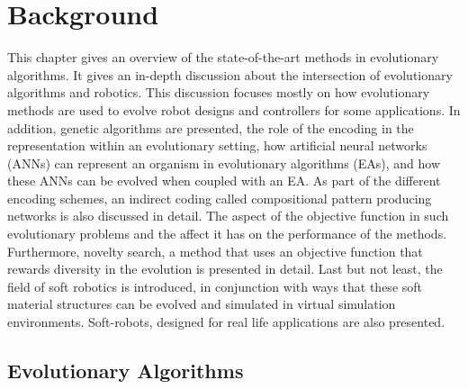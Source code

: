 
\chapter{Background} %

\label{Background} %


This chapter gives an overview of the state-of-the-art methods in evolutionary algorithms. It gives an in-depth discussion about the intersection of evolutionary algorithms and robotics. This discussion focuses mostly on how evolutionary methods are used to evolve robot designs and controllers for some applications. In addition, genetic algorithms are presented, the role of the encoding in the representation within an evolutionary setting,  how artificial neural networks (ANNs) can represent an organism in evolutionary algorithms (EAs), and how these ANNs can be evolved when coupled with an EA. As part of the different encoding schemes, an indirect coding called compositional pattern producing networks is also discussed in detail. The aspect of the objective function in such evolutionary problems and the affect it has on the performance of the methods. Furthermore, novelty search, a method that uses an objective function that rewards diversity in the evolution is presented in detail. Last but not least, the field of soft robotics  is introduced, in conjunction with ways that these soft material structures can be evolved and simulated in virtual simulation environments. Soft-robots, designed for real life applications are also presented.




\section{Evolutionary Algorithms}

